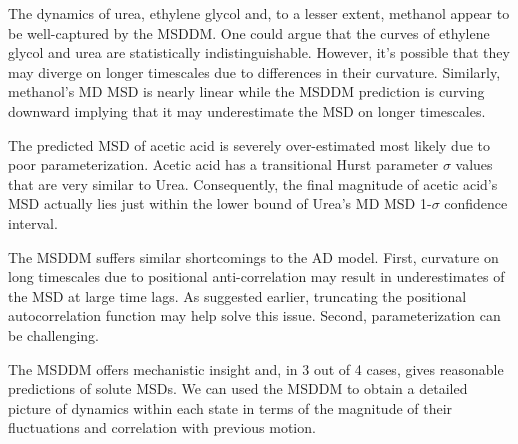 \documentclass{article}
\begin{document}
  The dynamics of urea, ethylene glycol and, to a lesser extent, methanol 
  appear to be well-captured by the MSDDM. One could argue that the curves
  of ethylene glycol and urea are statistically indistinguishable. However, 
  it's possible that they may diverge on longer timescales due to differences
  in their curvature. Similarly, methanol's MD MSD is nearly linear while 
  the MSDDM prediction is curving downward implying that it may underestimate
  the MSD on longer timescales. 
  
  The predicted MSD of acetic acid is severely over-estimated most likely due
  to poor parameterization. Acetic acid has a transitional Hurst parameter 
  $\sigma$ values that are very similar to Urea. Consequently, the final 
  magnitude of acetic acid's MSD actually lies just within the lower bound
  of Urea's MD MSD 1-$\sigma$ confidence interval.
  
  The MSDDM suffers similar shortcomings to the AD model. First, curvature 
  on long timescales due to positional anti-correlation may result in 
  underestimates of the MSD at large time lags. As suggested earlier, truncating
  the positional autocorrelation function may help solve this issue. Second, 
  parameterization can be challenging.
  
  The MSDDM offers mechanistic insight and, in 3 out of 4 cases, gives reasonable
  predictions of solute MSDs. We can used the MSDDM to obtain a detailed picture of dynamics within
  each state in terms of the magnitude of their fluctuations and correlation with previous 
  motion. 
  
  
\end{document}

